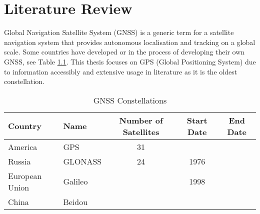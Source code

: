
\def\chapdir{./ChapterLiteratureReview}

\chapter{Literature Review} \label{ch:litreview}






Global Navigation Satellite System (GNSS) is a generic term for a satellite navigation system that provides autonomous localisation and tracking on a global scale. Some countries have developed or in the process of developing their own GNSS, see Table \ref{Table:gnss constellations}. This thesis focuses on GPS (Global Positioning System) due to information accessibly and extensive usage in literature as it is the oldest constellation.
\begin{table}
\centering
\caption{GNSS Constellations}
\label{Table:gnss constellations}
\begin{tabular}[width=\linewidth]{|l|l|c|c|c|}
\hline
Country & Name & Number of Satellites & Start Date & End Date \\\hline
America& GPS & 31 & &  \\\hline
Russia & GLONASS & 24 & 1976 &  \\\hline
European Union& Galileo &  & 1998 & \\\hline
China & Beidou & & &  \\\hline
\end{tabular}
\end{table}



